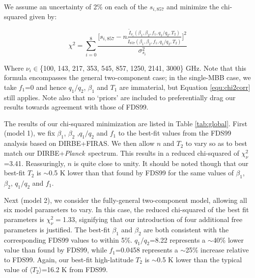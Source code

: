 \documentclass{emulateapj}
\newcommand{\PLANCK}{{\it Planck}}
\begin{document}
We assume an uncertainty of 2\% on each of the $s_{i, 857}$ and minimize the 
chi-squared given by:

\begin{equation} \label{equ:chi2corr}
\chi^2 = \sum_{i=0}^{8}\frac{\big[s_{i, 857}-n\frac{\tilde{I}_{\nu_i}(\beta_1, \beta_2, f_1, q_1/q_2, T_2)}{\tilde{I}_{857}(\beta_1, \beta_2, f_1, q_1/q_2, T_2)}\big]^2}{\sigma_{s_i}^2}
\end{equation}

Where $\nu_i$$\in$\{100, 143, 217, 353, 545, 857, 1250, 2141, 3000\} GHz. Note 
that this formula encompasses the general two-component case; in the single-MBB
case, we take $f_1$=0 and hence $q_1/q_2$, $\beta_1$ and $T_1$ are immaterial, 
but Equation \ref{equ:chi2corr} still applies. Note also that no `priors' are
included to preferentially drag our results towards agreement with those of 
FDS99.

The results of our chi-squared minimization are listed in Table 
\ref{tab:global}. First (model 1), we fix $\beta_1$, $\beta_2$ ,$q_1/q_2$ and
$f_1$ to the best-fit values from the FDS99 analysis based on DIRBE+FIRAS. We
then allow $n$ and $T_2$ to vary so as to best match our 
DIRBE+\PLANCK~spectrum. This results in a reduced chi-squared of 
$\chi^2_{\nu}$=3.41. Reassuringly, $n$ is quite close to unity. It should be 
noted though that our best-fit $T_2$ is $\sim$0.5 K lower than that found by 
FDS99 for the same values of $\beta_1$, $\beta_2$, $q_1/q_2$ and $f_1$.

Next (model 2), we consider the fully-general two-component model, allowing all
six model parameters to vary. In this case, the reduced chi-squared of the best
fit parameters is $\chi^2_{\nu}=$1.33, signifying that our introduction of four
additional free parameters is justified. The best-fit $\beta_1$ and $\beta_2$ 
are both consistent with the corresponding FDS99 values to within 5\%. 
$q_1/q_2$=8.22 represents a $\sim$40\% lower value than found by FDS99, while
$f_1$=0.0458 represents a $\sim$25\% increase relative to FDS99. Again, our
best-fit high-latitude $T_2$ is $\sim$0.5 K lower than the typical value of 
$\langle T_2 \rangle$=16.2 K from FDS99.
\end{document}
